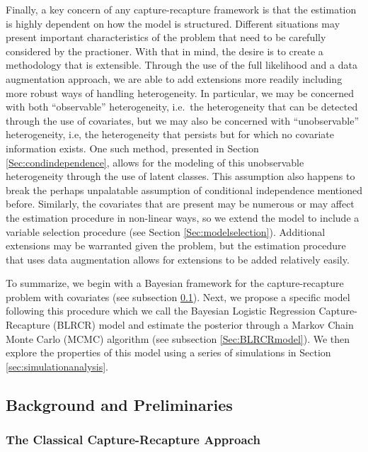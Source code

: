 \documentclass[
  12pt,
]{article}
\begin{document}
Finally, a key concern of any capture-recapture framework is that the
estimation is highly dependent on how the model is structured. Different
situations may present important characteristics of the problem that
need to be carefully considered by the practioner. With that in mind,
the desire is to create a methodology that is extensible. Through the
use of the full likelihood and a data augmentation approach, we are able
to add extensions more readily including more robust ways of handling
heterogeneity. In particular, we may be concerned with both
``observable'' heterogeneity, i.e.~the heterogeneity that can be
detected through the use of covariates, but we may also be concerned
with ``unobservable'' heterogeneity, i.e, the heterogeneity that
persists but for which no covariate information exists. One such method,
presented in Section \ref{Sec:condindependence}, allows for the modeling
of this unobservable heterogeneity through the use of latent classes.
This assumption also happens to break the perhaps unpalatable assumption
of conditional independence mentioned before. Similarly, the covariates
that are present may be numerous or may affect the estimation procedure
in non-linear ways, so we extend the model to include a variable
selection procedure (see Section \ref{Sec:modelselection}). Additional
extensions may be warranted given the problem, but the estimation
procedure that uses data augmentation allows for extensions to be added
relatively easily.

To summarize, we begin with a Bayesian framework for the
capture-recapture problem with covariates (see subsection
\ref{Sec:CRbackground}). Next, we propose a specific model following
this procedure which we call the Bayesian Logistic Regression
Capture-Recapture (BLRCR) model and estimate the posterior through a
Markov Chain Monte Carlo (MCMC) algorithm (see subsection
\ref{Sec:BLRCRmodel}). We then explore the properties of this model
using a series of simulations in Section \ref{sec:simulationanalysis}.

\subsection{Background and Preliminaries}
\label{Sec:CRbackground}

\subsubsection{The Classical Capture-Recapture Approach}
\label{sec:classicalCR}
\end{document}
